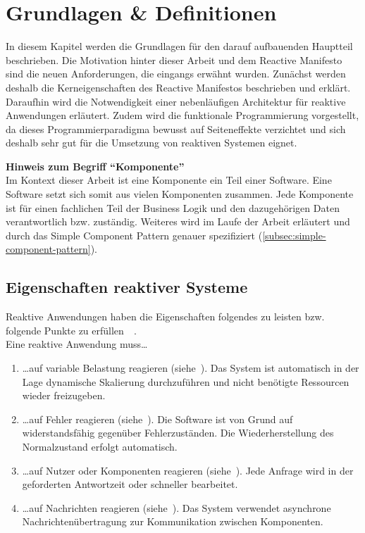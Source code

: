 \chapter{Grundlagen \& Definitionen}
In diesem Kapitel werden die Grundlagen für den darauf aufbauenden Hauptteil beschrieben. Die Motivation hinter dieser Arbeit und dem Reactive Manifesto sind die neuen Anforderungen, die eingangs erwähnt wurden. Zunächst werden deshalb die Kerneigenschaften des Reactive Manifestos beschrieben und erklärt. Daraufhin wird die Notwendigkeit einer nebenläufigen Architektur für reaktive Anwendungen erläutert. Zudem wird die funktionale Programmierung vorgestellt, da dieses Programmierparadigma bewusst auf Seiteneffekte verzichtet und sich deshalb sehr gut für die Umsetzung von reaktiven Systemen eignet.

\vspace{5cm}
\begin{framed}
\textbf{Hinweis zum Begriff \enquote{Komponente}}\\
Im Kontext dieser Arbeit ist eine Komponente ein Teil einer Software. Eine Software setzt sich somit aus vielen Komponenten zusammen. Jede Komponente ist für einen fachlichen Teil der Business Logik und den dazugehörigen Daten verantwortlich bzw. zuständig. Weiteres wird im Laufe der Arbeit erläutert und durch das Simple Component Pattern genauer spezifiziert (\ref{subsec:simple-component-pattern}).
\end{framed}

\pagebreak

\section{Eigenschaften reaktiver Systeme}
Reaktive Anwendungen haben die Eigenschaften folgendes zu leisten bzw. folgende Punkte zu erfüllen~\cite[S.~19ff]{kuhn_reactive_2015}~\cite[S.~6]{vernon_reactive_2016}.\\
Eine reaktive Anwendung muss\ldots
\begin{enumerate}
\item \ldots auf variable Belastung reagieren (siehe~). Das System ist automatisch in der Lage dynamische Skalierung durchzuführen und nicht benötigte Ressourcen wieder freizugeben.
\item \ldots auf Fehler reagieren (siehe~). Die Software ist von Grund auf widerstandsfähig gegenüber Fehlerzuständen. Die Wiederherstellung des Normalzustand erfolgt automatisch.
\item \ldots auf Nutzer oder Komponenten reagieren (siehe~). Jede Anfrage wird in der geforderten Antwortzeit oder schneller bearbeitet.
\item \ldots auf Nachrichten reagieren (siehe~). Das System verwendet asynchrone Nachrichtenübertragung zur Kommunikation zwischen Komponenten.
\end{enumerate}

